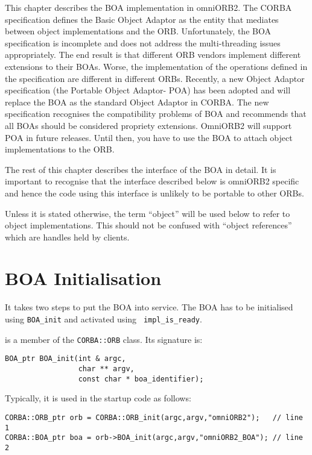 \documentclass[11pt,twoside,onecolumn]{book}
\begin{document}
This chapter describes the BOA implementation in omniORB2. The CORBA
specification defines the Basic Object Adaptor as the entity that mediates
between object implementations and the ORB. Unfortunately, the BOA
specification is incomplete and does not address the multi-threading issues
appropriately. The end result is that different ORB vendors implement
different extensions to their BOAs. Worse, the implementation of the operations
defined in the specification are different in different ORBs. Recently, a new
Object Adaptor specification (the Portable Object Adaptor- POA) has been
adopted and will replace the BOA as the standard Object Adaptor in
CORBA. The new specification recognises the compatibility problems of BOA
and recommends that all BOAs should be considered propriety extensions.
OmniORB2 will support POA in future releases. Until then, you have to
use the BOA to attach object implementations to the ORB. 

The rest of this chapter describes the interface of the BOA in detail. It
is important to recognise that the interface described below is omniORB2
specific and hence the code using this interface is unlikely to be portable
to other ORBs.

Unless it is stated otherwise, the term ``object'' will be used below to
refer to object implementations. This should not be confused with ``object
references'' which are handles held by clients.

\section{BOA Initialisation}

It takes two steps to put the BOA into service. The BOA has to be
initialised using {\tt BOA\_init} and activated using {\tt
impl\_is\_ready}.


 is a member of the {\tt CORBA::ORB} class. Its signature is:

{\small
\begin{verbatim}
BOA_ptr BOA_init(int & argc,
                 char ** argv,
                 const char * boa_identifier);
\end{verbatim}
}

\noindent Typically, it is used in the startup code as follows:

{\small
\begin{verbatim}
CORBA::ORB_ptr orb = CORBA::ORB_init(argc,argv,"omniORB2");   // line 1
CORBA::BOA_ptr boa = orb->BOA_init(argc,argv,"omniORB2_BOA"); // line 2
\end{verbatim}
}
\end{document}
